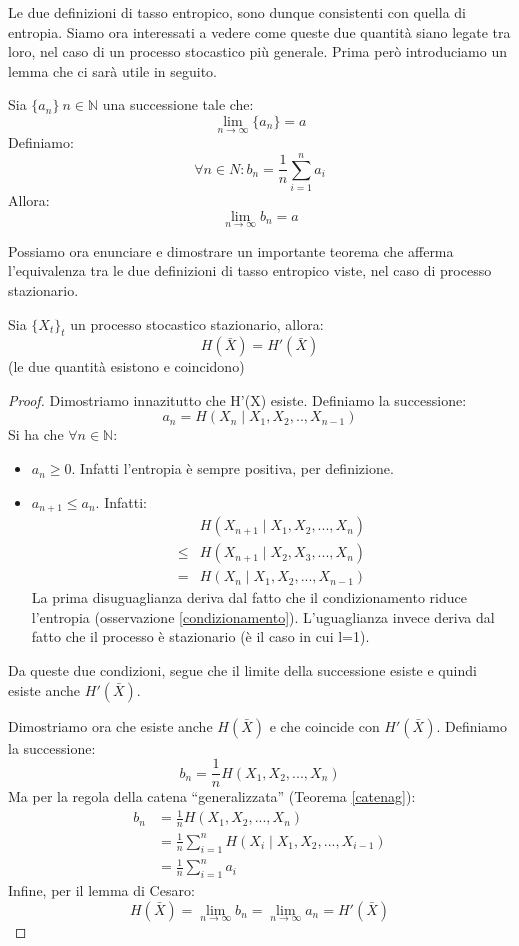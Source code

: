 Le due definizioni di tasso entropico, sono dunque consistenti con quella di entropia. Siamo ora interessati a vedere come queste 
due quantità siano legate tra loro, nel caso di un processo stocastico più generale.
Prima però introduciamo un lemma che ci sarà utile in seguito.

\begin{lemma}
Sia $\{a_n\} \ n \in \mathbb{N}$ una successione tale che:
\[
 \lim_{n \to \infty} \{a_n\}=a
\]
Definiamo:
\[
 \forall n \in N: b_n=\frac{1}{n} \sum_{i=1}^n a_i
\]
Allora:
\[
 \lim_{n \to \infty} b_n=a
\]
\end{lemma}

Possiamo ora enunciare e dimostrare un importante teorema che afferma l'equivalenza tra le due definizioni di tasso entropico viste, 
nel caso di processo stazionario.

\begin{teorema}
Sia $\{X_t\}_t$ un processo stocastico stazionario, allora:
\[
 H(\bar{X})=H'(\bar{X})
\]
(le due quantità esistono e coincidono)
 \begin{proof}
 \mbox{}

 Dimostriamo innazitutto che H'(X) esiste.
 Definiamo la successione: 
 \[
  a_n=H(X_n \mid X_1,X_2,..,X_{n-1})
 \]
 Si ha che $\forall n \in \mathbb{N}$:
 \begin{itemize}
 \item $a_n \ge 0$. Infatti l'entropia è sempre positiva, per definizione.
 \item $a_{n+1} \le a_n$. Infatti:
 \[\begin{split}
   &H(X_{n+1} \mid X_1,X_2,...,X_n)  \\
   \le &H(X_{n+1} \mid X_2,X_3,...,X_n) \\
   = &H(X_{n} \mid X_1,X_2,...,X_{n-1})
   \end{split}
 \]
 La prima disuguaglianza deriva dal fatto che il condizionamento riduce l'entropia (osservazione \ref{condizionamento}). L'uguaglianza invece deriva dal fatto che il processo è stazionario (è il caso in cui l=1).
 \end{itemize}

 \noindent
 Da queste due condizioni, segue che il limite della successione esiste e quindi esiste anche $H'(\bar{X})$.
 
 \noindent
 Dimostriamo ora che esiste anche $H(\bar{X})$ e che coincide con $H'(\bar{X})$.
 Definiamo la successione:
 \[
  b_n=\frac{1}{n} H(X_1,X_2,...,X_n)
 \]
 Ma per la regola della catena ``generalizzata'' (Teorema \ref{catenag}):
 \[\begin{split}
  b_n &=\frac{1}{n} H(X_1,X_2,...,X_n) \\
      &=\frac{1}{n} \sum_{i=1}^n H(X_i \mid X_1,X_2,...,X_{i-1}) \\
      &=\frac{1}{n} \sum_{i=1}^n a_i
   \end{split}
 \]
 Infine, per il lemma di Cesaro:
 \[
  H(\bar{X})=\lim_{n \to \infty} b_n= \lim_{n \to \infty} a_n=H'(\bar{X})
 \]


 \end{proof}
 
\end{teorema}

